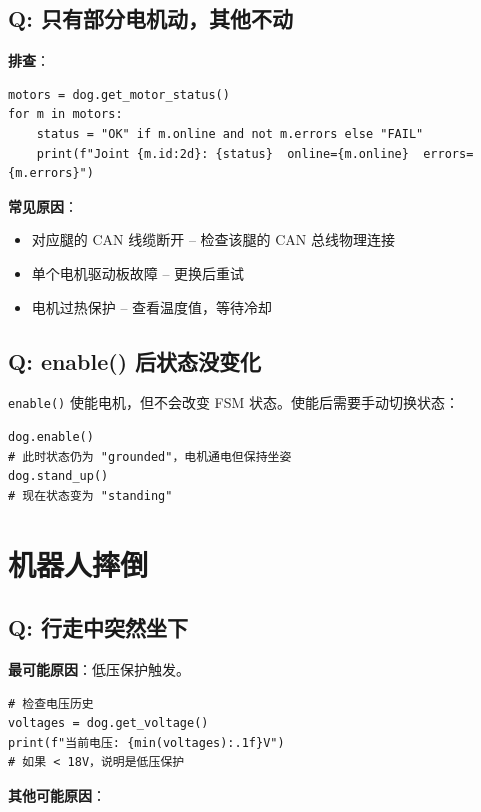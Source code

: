 \documentclass[a4paper,11pt,openany]{book}
\begin{document}
\subsection{Q: 只有部分电机动，其他不动}

\noindent\textbf{排查}：

\begin{lstlisting}[style=python]
motors = dog.get_motor_status()
for m in motors:
    status = "OK" if m.online and not m.errors else "FAIL"
    print(f"Joint {m.id:2d}: {status}  online={m.online}  errors={m.errors}")
\end{lstlisting}

\noindent\textbf{常见原因}：
\begin{itemize}[nosep]
  \item 对应腿的 CAN 线缆断开 -- 检查该腿的 CAN 总线物理连接
  \item 单个电机驱动板故障 -- 更换后重试
  \item 电机过热保护 -- 查看温度值，等待冷却
\end{itemize}

\subsection{Q: enable() 后状态没变化}

\texttt{enable()} 使能电机，但不会改变 FSM 状态。使能后需要手动切换状态：

\begin{lstlisting}[style=python]
dog.enable()
# 此时状态仍为 "grounded"，电机通电但保持坐姿
dog.stand_up()
# 现在状态变为 "standing"
\end{lstlisting}

\section{机器人摔倒}

\subsection{Q: 行走中突然坐下}

\noindent\textbf{最可能原因}：低压保护触发。

\begin{lstlisting}[style=python]
# 检查电压历史
voltages = dog.get_voltage()
print(f"当前电压: {min(voltages):.1f}V")
# 如果 < 18V，说明是低压保护
\end{lstlisting}

\noindent\textbf{其他可能原因}：
\end{document}
